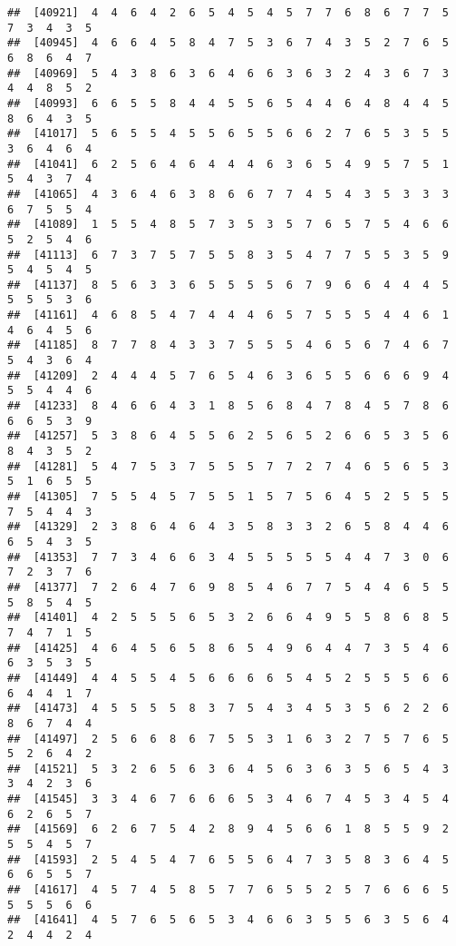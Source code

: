 \documentclass[
]{book}
\begin{document}
\begin{verbatim}
##  [40921]  4  4  6  4  2  6  5  4  5  4  5  7  7  6  8  6  7  7  5  7  3  4  3  5
##  [40945]  4  6  6  4  5  8  4  7  5  3  6  7  4  3  5  2  7  6  5  6  8  6  4  7
##  [40969]  5  4  3  8  6  3  6  4  6  6  3  6  3  2  4  3  6  7  3  4  4  8  5  2
##  [40993]  6  6  5  5  8  4  4  5  5  6  5  4  4  6  4  8  4  4  5  8  6  4  3  5
##  [41017]  5  6  5  5  4  5  5  6  5  5  6  6  2  7  6  5  3  5  5  3  6  4  6  4
##  [41041]  6  2  5  6  4  6  4  4  4  6  3  6  5  4  9  5  7  5  1  5  4  3  7  4
##  [41065]  4  3  6  4  6  3  8  6  6  7  7  4  5  4  3  5  3  3  3  6  7  5  5  4
##  [41089]  1  5  5  4  8  5  7  3  5  3  5  7  6  5  7  5  4  6  6  5  2  5  4  6
##  [41113]  6  7  3  7  5  7  5  5  8  3  5  4  7  7  5  5  3  5  9  5  4  5  4  5
##  [41137]  8  5  6  3  3  6  5  5  5  5  6  7  9  6  6  4  4  4  5  5  5  5  3  6
##  [41161]  4  6  8  5  4  7  4  4  4  6  5  7  5  5  5  4  4  6  1  4  6  4  5  6
##  [41185]  8  7  7  8  4  3  3  7  5  5  5  4  6  5  6  7  4  6  7  5  4  3  6  4
##  [41209]  2  4  4  4  5  7  6  5  4  6  3  6  5  5  6  6  6  9  4  5  5  4  4  6
##  [41233]  8  4  6  6  4  3  1  8  5  6  8  4  7  8  4  5  7  8  6  6  6  5  3  9
##  [41257]  5  3  8  6  4  5  5  6  2  5  6  5  2  6  6  5  3  5  6  8  4  3  5  2
##  [41281]  5  4  7  5  3  7  5  5  5  7  7  2  7  4  6  5  6  5  3  5  1  6  5  5
##  [41305]  7  5  5  4  5  7  5  5  1  5  7  5  6  4  5  2  5  5  5  7  5  4  4  3
##  [41329]  2  3  8  6  4  6  4  3  5  8  3  3  2  6  5  8  4  4  6  6  5  4  3  5
##  [41353]  7  7  3  4  6  6  3  4  5  5  5  5  5  4  4  7  3  0  6  7  2  3  7  6
##  [41377]  7  2  6  4  7  6  9  8  5  4  6  7  7  5  4  4  6  5  5  5  8  5  4  5
##  [41401]  4  2  5  5  5  6  5  3  2  6  6  4  9  5  5  8  6  8  5  7  4  7  1  5
##  [41425]  4  6  4  5  6  5  8  6  5  4  9  6  4  4  7  3  5  4  6  6  3  5  3  5
##  [41449]  4  4  5  5  4  5  6  6  6  6  5  4  5  2  5  5  5  6  6  6  4  4  1  7
##  [41473]  4  5  5  5  5  8  3  7  5  4  3  4  5  3  5  6  2  2  6  8  6  7  4  4
##  [41497]  2  5  6  6  8  6  7  5  5  3  1  6  3  2  7  5  7  6  5  5  2  6  4  2
##  [41521]  5  3  2  6  5  6  3  6  4  5  6  3  6  3  5  6  5  4  3  3  4  2  3  6
##  [41545]  3  3  4  6  7  6  6  6  5  3  4  6  7  4  5  3  4  5  4  6  2  6  5  7
##  [41569]  6  2  6  7  5  4  2  8  9  4  5  6  6  1  8  5  5  9  2  5  5  4  5  7
##  [41593]  2  5  4  5  4  7  6  5  5  6  4  7  3  5  8  3  6  4  5  6  6  5  5  7
##  [41617]  4  5  7  4  5  8  5  7  7  6  5  5  2  5  7  6  6  6  5  5  5  5  6  6
##  [41641]  4  5  7  6  5  6  5  3  4  6  6  3  5  5  6  3  5  6  4  2  4  4  2  4

\end{verbatim}
\end{document}
